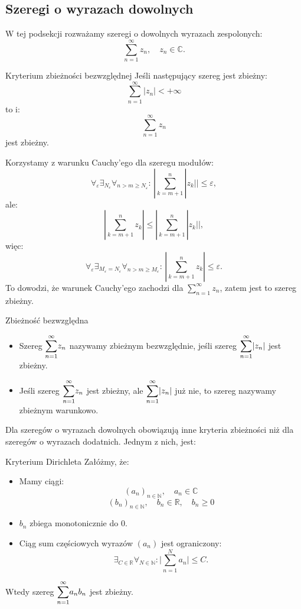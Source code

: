 \documentclass{article}
\numberwithin{defi}{section}
\numberwithin{defi}{section}
\newcommand{\R}{\mathbb{R}}
\newcommand{\N}{\mathbb{N}}
\newcommand{\C}{\mathbb{C}}
\newcommand{\oo}{\infty}
\begin{document}
\subsection{Szeregi o wyrazach dowolnych}
W tej podsekcji rozważamy szeregi o dowolnych wyrazach zespolonych:
\[\sum_{n=1}^{\oo} z_n, \quad z_n \in \C.\]
\begin{twier}{Kryterium zbieżności bezwzględnej}
    Jeśli następujący szereg jest zbieżny:
    \[\sum_{n=1}^{\oo} |z_n| < + \oo\] to i:
    \[\sum_{n=1}^{\oo} z_n\]
    jest zbieżny.

\end{twier}
\begin{dow}
    Korzystamy z warunku Cauchy'ego dla szeregu modułów:
    \[\forall_{\varepsilon}\exists_{N_{\varepsilon}}\forall_{n > m\geqslant N_{\varepsilon}}:\, |\sum_{k=m+1}^{n} |z_k|| \leqslant \varepsilon,\]
    ale:
    \[|\sum_{k=m+1}^{n} z_k| \leqslant |\sum_{k=m+1}^{n} |z_k||,\]
    więc:
    \[\forall_{\varepsilon}\exists_{M_{\varepsilon} = N_{\varepsilon}}\forall_{n > m\geqslant M_{\varepsilon}}:\, |\sum_{k=m+1}^{n} z_k| \leqslant \varepsilon.\]
    To dowodzi, że warunek Cauchy'ego zachodzi dla $\sum_{n=1}^{\oo}z_n$, zatem jest to szereg zbieżny.
\end{dow}
\begin{defr}{Zbieżność bezwzględna}
    \begin{itemize}
        \item Szereg $\mathlarger{\sum}_{n=1}^{\oo} z_n$ nazywamy zbieżnym bezwzględnie, jeśli szereg $\mathlarger{\sum}_{n=1}^{\oo} |z_n|$ jest zbieżny. \\
        \item Jeśli szereg $\mathlarger{\sum}_{n=1}^{\oo} z_n$ jest zbieżny, ale $\mathlarger{\sum}_{n=1}^{\oo} |z_n|$ już nie, to szereg nazywamy zbieżnym warunkowo.
    \end{itemize}
\end{defr}

Dla szeregów o wyrazach dowolnych obowiązują inne kryteria zbieżności niż dla szeregów o wyrazach dodatnich. Jednym z nich, jest:
\begin{twier}{Kryterium Dirichleta}
    Załóżmy, że:
    \begin{itemize}
        \item Mamy ciągi:
              \[(a_n)_{n\in \N}, \quad a_n \in \C \]
              \[(b_n)_{n\in \N}, \quad b_n \in \R, \quad b_n \geqslant 0\]
        \item $b_n$ zbiega monotonicznie do 0.
        \item Ciąg sum częściowych wyrazów $(a_n)$ jest ograniczony:
              \[\exists_{C \in \R} \forall_{N \in \N}: \big| \sum_{n=1}^{N} a_n \big| \leqslant C.\]
    \end{itemize}
    Wtedy szereg $\mathlarger{\sum}_{n=1}^{\oo} a_n b_n$ jest zbieżny.
\end{twier}
\end{document}
